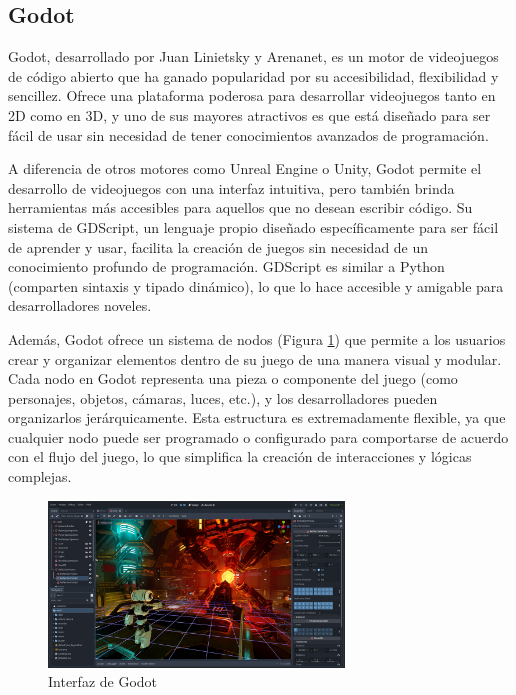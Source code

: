 \subsection{Godot}

Godot, desarrollado por Juan Linietsky y Arenanet, es un motor de videojuegos de código abierto que ha ganado popularidad por su accesibilidad, flexibilidad y sencillez. Ofrece una plataforma poderosa para desarrollar videojuegos tanto en 2D como en 3D, y uno de sus mayores atractivos es que está diseñado para ser fácil de usar sin necesidad de tener conocimientos avanzados de programación.

A diferencia de otros motores como Unreal Engine o Unity, Godot permite el desarrollo de videojuegos con una interfaz intuitiva, pero también brinda herramientas más accesibles para aquellos que no desean escribir código. Su sistema de GDScript, un lenguaje propio diseñado específicamente para ser fácil de aprender y usar, facilita la creación de juegos sin necesidad de un conocimiento profundo de programación. GDScript es similar a Python (comparten sintaxis y tipado dinámico), lo que lo hace accesible y amigable para desarrolladores noveles.

Además, Godot ofrece un sistema de nodos (Figura \ref{fig:Godot_Figure}) que permite a los usuarios crear y organizar elementos dentro de su juego de una manera visual y modular. Cada nodo en Godot representa una pieza o componente del juego (como personajes, objetos, cámaras, luces, etc.), y los desarrolladores pueden organizarlos jerárquicamente. Esta estructura es extremadamente flexible, ya que cualquier nodo puede ser programado o configurado para comportarse de acuerdo con el flujo del juego, lo que simplifica la creación de interacciones y lógicas complejas.
\begin{figure}[h]
	\centering
	\includegraphics[width = 0.7\textwidth]{Imagenes/Godot.jpg}
	\caption{Interfaz de Godot}
	\label{fig:Godot_Figure}
\end{figure}

